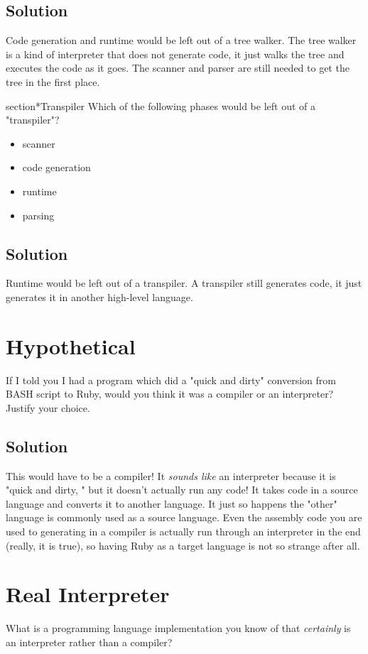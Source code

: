 \documentclass[twoside=false, DIV=14]{scrartcl}
\begin{document}
\subsection*{Solution}
Code generation and runtime would be left out of a tree walker.  The tree walker is a kind of interpreter that does not generate code, it just walks the tree and executes the code as it goes.  The scanner and parser are still needed to get the tree in the first place.

section*{Transpiler}
Which of the following phases would be left out of a "transpiler"?
\begin{itemize}
    \item scanner
    \item code generation
    \item runtime
    \item parsing
\end{itemize}
\subsection*{Solution}
Runtime would be left out of a transpiler.  A transpiler still generates code, it just generates it in another high-level language.

\section*{Hypothetical}
  If I told you I had a program which did a "quick and dirty" conversion from BASH script to Ruby, would you think it was a compiler or an interpreter?  Justify your choice.
  \subsection*{Solution}
  This would have to be a compiler! It \emph{sounds like} an interpreter because it is "quick and dirty, " but it doesn't actually run any code! It takes code in a source language and converts it to another language. It just so happens the "other" language is commonly used as a source language. Even the assembly code you are used to generating in a compiler is actually run through an interpreter in the end (really, it is true), so having Ruby as a target language is not so strange after all.

\section*{Real Interpreter}
What is a programming language implementation you know of that \emph{certainly} is an interpreter rather than a compiler?
\end{document}
